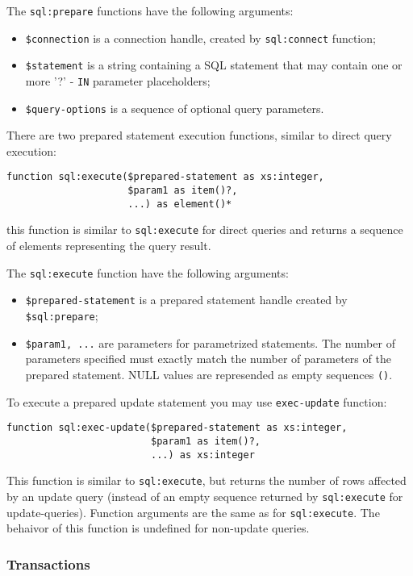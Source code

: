 \documentclass[a4paper,12pt]{article}
\newenvironment{citemize}
{\begin{itemize}
  \setlength{\itemsep}{0pt}
  \setlength{\parskip}{0pt}
  \setlength{\parsep}{0pt}}
{\end{itemize}}
\begin{document}
The \verb!sql:prepare! functions have the following arguments:

\begin{citemize}
\item \verb!$connection! is a connection handle, created by \verb!sql:connect!
function;
\item \verb!$statement! is a string containing a SQL statement that may
contain one or more '?' - \verb!IN! parameter placeholders;
\item \verb!$query-options! is a sequence of optional query parameters.
\end{citemize}

There are two prepared statement execution functions, similar to direct
query execution:

\begin{verbatim}
function sql:execute($prepared-statement as xs:integer,
                     $param1 as item()?, 
                     ...) as element()*
\end{verbatim}
this function is similar to \verb!sql:execute! for direct queries and returns a
sequence of elements representing the query result.

The \verb!sql:execute! function have the following arguments:

\begin{citemize}
\item\verb!$prepared-statement! is a prepared statement handle created by
\verb!$sql:prepare!;
\item\verb!$param1, ...! are parameters for parametrized
statements. The number of parameters specified must exactly match the number
of parameters of the prepared statement. NULL values are represended as empty
sequences \verb!()!.
\end{citemize}

To execute a prepared update statement you may use \verb!exec-update! function:
\begin{verbatim}
function sql:exec-update($prepared-statement as xs:integer,
                         $param1 as item()?, 
                         ...) as xs:integer
\end{verbatim}
This function is similar to \verb!sql:execute!, but returns the number of rows
affected by an update query (instead of an empty sequence returned by
\verb!sql:execute! for update-queries). Function arguments are the same as for
\verb!sql:execute!. The behaivor of this function is undefined for non-update
queries.


\subsubsection*{Transactions}
\end{document}
